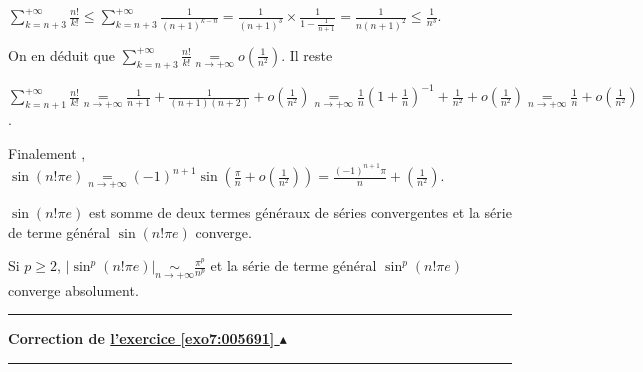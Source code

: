 \documentclass[11pt,a4paper]{article}
\newcounter{exo}
\newcommand{\correction}[1]{\hypertarget{cor7:#1}{}\label{cor7:#1}{\bf Correction de \hyperlink{exo7:#1}{l'exercice \ref{exo7:#1} $\blacktriangle$}}\vspace{1mm}\hrule\vspace{1mm}}
\newcommand{\fincorrection}{\vspace{1mm}\hrule\vspace*{7mm}}
\begin{document}
\begin{enumerate}
\begin{center} 
$\sum_{k=n+3}^{+\infty}\frac{n!}{k!}\leqslant\sum_{k=n+3}^{+\infty}\frac{1}{(n+1)^{k-n}}=\frac{1}{(n+1)^3}\times\frac{1}{1-\frac{1}{n+1}}=\frac{1}{n(n+1)^2}\leqslant\frac{1}{n^3}$.
\end{center}

On en déduit que $\sum_{k=n+3}^{+\infty}\frac{n!}{k!}\underset{n\rightarrow+\infty}{=}o\left(\frac{1}{n^2}\right)$. Il reste

\begin{center}
$\sum_{k=n+1}^{+\infty}\frac{n!}{k!}\underset{n\rightarrow+\infty}{=}
\frac{1}{n+1}+\frac{1}{(n+1)(n+2)}+o\left(\frac{1}{n^2}\right)\underset{n\rightarrow+\infty}{=}\frac{1}{n}\left(1+\frac{1}{n}\right)^{-1}+\frac{1}{n^2}+o\left(\frac{1}{n^2}\right)
\underset{n\rightarrow+\infty}{=}\frac{1}{n}+o\left(\frac{1}{n^2}\right)
$.
\end{center}

Finalement , $\sin(n!\pi e)\underset{n\rightarrow+\infty}{=}(-1)^{n+1}\sin\left(\frac{\pi}{n}+o\left(\frac{1}{n^2}\right)\right)=\frac{(-1)^{n+1}\pi}{n}+\left(\frac{1}{n^2}\right)$.

$\sin(n!\pi e)$ est somme de deux termes généraux de séries convergentes et la série de terme général $\sin(n!\pi e)$ converge.

Si $p\geqslant2$, $|\sin^p(n!\pi e)|\underset{n\rightarrow+\infty}{\sim}\frac{\pi^p}{n^p}$ et la série de terme général $\sin^p(n!\pi e)$ converge absolument.
\end{enumerate}
\fincorrection
\correction{005691}
\end{document}
